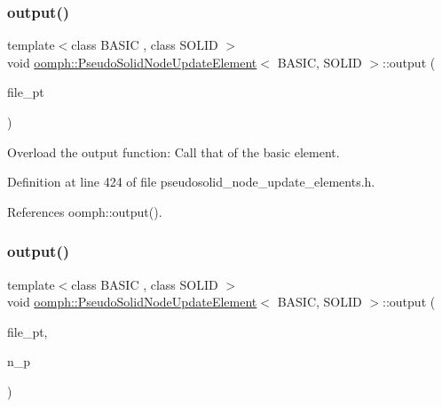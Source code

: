 \subsubsection{\texorpdfstring{output()}{output()}\hspace{0.1cm}{\footnotesize\ttfamily [3/4]}}
{\footnotesize\ttfamily template$<$class B\+A\+S\+IC , class S\+O\+L\+ID $>$ \\
void \hyperlink{classoomph_1_1PseudoSolidNodeUpdateElement}{oomph\+::\+Pseudo\+Solid\+Node\+Update\+Element}$<$ B\+A\+S\+IC, S\+O\+L\+ID $>$\+::output (\begin{DoxyParamCaption}\item[{F\+I\+LE $\ast$}]{file\+\_\+pt }\end{DoxyParamCaption})\hspace{0.3cm}{\ttfamily [inline]}}



Overload the output function\+: Call that of the basic element. 



Definition at line 424 of file pseudosolid\+\_\+node\+\_\+update\+\_\+elements.\+h.



References oomph\+::output().

\mbox{\label{classoomph_1_1PseudoSolidNodeUpdateElement_ac4e895c35d56c2137bd35ad988264bc8}} 
\subsubsection{\texorpdfstring{output()}{output()}\hspace{0.1cm}{\footnotesize\ttfamily [4/4]}}
{\footnotesize\ttfamily template$<$class B\+A\+S\+IC , class S\+O\+L\+ID $>$ \\
void \hyperlink{classoomph_1_1PseudoSolidNodeUpdateElement}{oomph\+::\+Pseudo\+Solid\+Node\+Update\+Element}$<$ B\+A\+S\+IC, S\+O\+L\+ID $>$\+::output (\begin{DoxyParamCaption}\item[{F\+I\+LE $\ast$}]{file\+\_\+pt,  }\item[{const unsigned \&}]{n\+\_\+p }\end{DoxyParamCaption})\hspace{0.3cm}{\ttfamily [inline]}}



